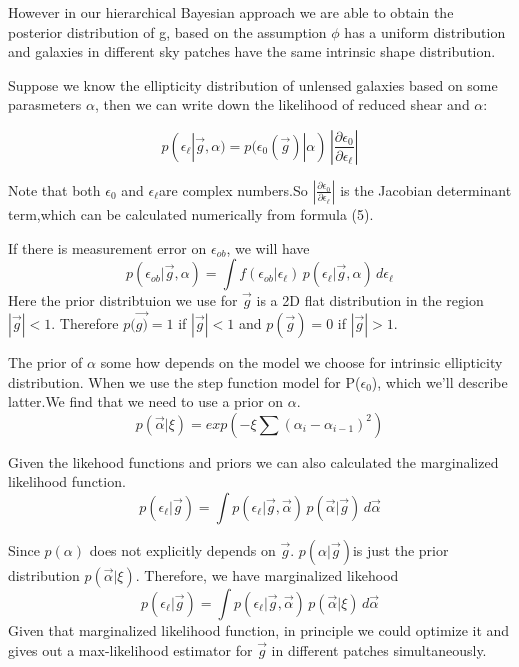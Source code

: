 \documentclass[useAMS,usenatbib]{mn2e}
\begin{document}
However in our hierarchical Bayesian approach we are able to obtain
the posterior distribution of g, based on the assumption $\phi$ has
a uniform distribution and galaxies in different sky patches have
the same intrinsic shape distribution.

Suppose we know the ellipticity distribution of unlensed galaxies
based on some parasmeters $\alpha$, then we can write down the likelihood
of reduced shear and $\alpha$:

\begin{equation}
p(\epsilon_{\ell}|\vec{g},\alpha)=p(\epsilon_{0}(\vec{g})|\alpha)\,|\frac{\partial\epsilon_{0}}{\partial\epsilon_{\ell}}|
\end{equation}



Note that both $\epsilon_{0}$ and $\epsilon_{\ell}$are complex numbers.So
$|\frac{\partial\epsilon_{0}}{\partial\epsilon_{\ell}}|$ is the Jacobian
determinant term,which can be calculated numerically from formula
(5).

If there is measurement error on $\epsilon_{ob}$, we will have 
\begin{equation}
p(\epsilon_{ob}|\vec{g},\alpha)=\int f(\epsilon_{ob}|\epsilon_{\ell})\, p(\epsilon_{\ell}|\vec{g},\alpha)\,d\epsilon_{\ell}
\end{equation}
Here the prior distribtuion we use for $\vec{g}$ is a 2D flat distribution
in the region $|\vec{g}|<1$. Therefore $p(\vec{g)}=1$ if $|\vec{g}|<1$
and $p(\vec{g})=0$ if $|\vec{g}|>1$.

The prior of $\alpha$ some how depends on the model we choose for
intrinsic ellipticity distribution. When we use the step function
model for P($\epsilon_{0}$), which we'll describe latter.We find that
we need to use a prior on $\alpha$. 
\begin{equation}
p(\vec{\alpha}|\xi)=exp(-\xi\sum(\alpha_{i}-\alpha_{i-1})^{2})
\end{equation}


Given the likehood functions and priors we can also calculated the
marginalized likelihood function. 
\begin{equation}
p(\epsilon_{\ell}|\vec{g})=\int p(\epsilon_{\ell}|\vec{g},\vec{\alpha})\,p(\vec{\alpha}|\vec{g})\,d\vec{\alpha}
\end{equation}


Since $p(\alpha)$ does not explicitly depends on $\vec{g}$. $p(\alpha|\vec{g})$is
just the prior distribution $p(\vec{\alpha}|\xi)$. Therefore, we have
marginalized likehood 
\begin{equation}
p(\epsilon_{\ell}|\vec{g})=\int p(\epsilon_{\ell}|\vec{g},\vec{\alpha})\, p(\vec{\alpha}|\xi)\,d\vec{\alpha}
\end{equation}
Given that marginalized likelihood function, in principle we could
optimize it and gives out a max-likelihood estimator for $\vec{g}$
in different patches simultaneously.
\end{document}
